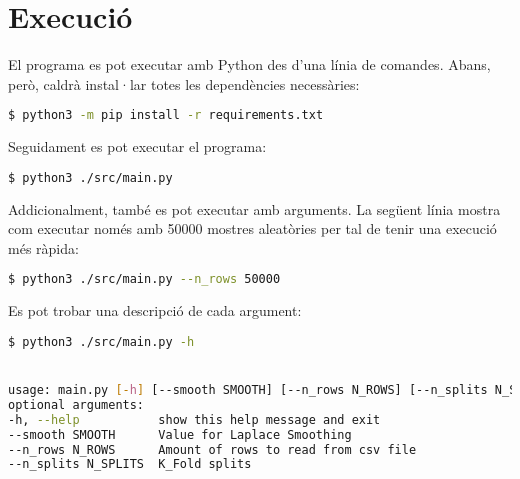 \chapter{Execució}
El programa es pot executar amb Python des d’una línia de comandes. Abans, però, caldrà instal·lar totes les dependències necessàries:
\begin{lstlisting}[language=bash]
  $ python3 -m pip install -r requirements.txt
\end{lstlisting}\leavevmode\newline
Seguidament es pot executar el programa:
\begin{lstlisting}[language=bash]
  $ python3 ./src/main.py
\end{lstlisting}\leavevmode\newline
Addicionalment, també es pot executar amb arguments. La següent línia mostra com executar només amb 50000 mostres aleatòries per tal de tenir una execució més ràpida:
\begin{lstlisting}[language=bash]
  $ python3 ./src/main.py --n_rows 50000
\end{lstlisting}\leavevmode\newline
Es pot trobar una descripció de cada argument:
\begin{lstlisting}[language=bash]
  $ python3 ./src/main.py -h 


usage: main.py [-h] [--smooth SMOOTH] [--n_rows N_ROWS] [--n_splits N_SPLITS]
optional arguments:
-h, --help           show this help message and exit
--smooth SMOOTH      Value for Laplace Smoothing
--n_rows N_ROWS      Amount of rows to read from csv file
--n_splits N_SPLITS  K_Fold splits

\end{lstlisting}